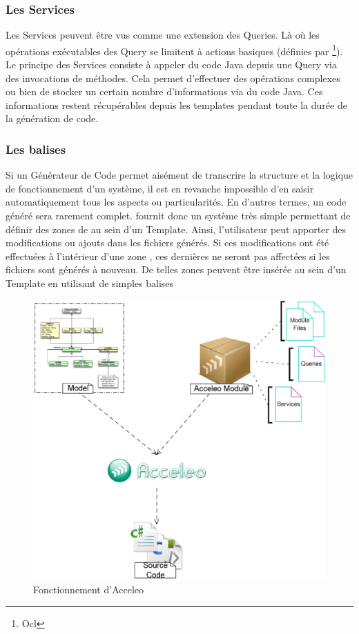 \subsubsection{Les Services}

Les Services peuvent être vus comme une extension des Queries. Là où les opérations exécutables des Query se limitent à actions basiques (définies par \footnote{Ocl}{}). Le principe des Services consiste à appeler du code Java depuis une Query via des invocations de méthodes. Cela permet d'effectuer des opérations complexes ou bien de stocker un certain nombre d'informations via du code Java. Ces informations restent récupérables depuis les templates pendant toute la durée de la génération de code.

\subsubsection{Les balises }

Si un Générateur de Code permet aisément de transcrire la structure et la logique de fonctionnement d'un système, il est en revanche impossible d'en saisir automatiquement tous les aspects ou particularités. En d'autres termes, un code généré sera rarement complet. \kwacceleo fournit donc un système très simple permettant de définir des zones de  au sein d'un Template. Ainsi, l'utilisateur peut apporter des modifications ou ajouts dans les fichiers générés. Si ces modifications ont été effectuées à l'intérieur d'une zone , ces dernières ne seront pas affectées si les fichiers sont générés à nouveau. De telles zones peuvent être insérée au sein d'un Template en utilisant de simples balises \guim{\textit{\textbf{[protected]}}}

\begin{figure}[htb]
  \centering
  \includegraphics[scale=0.29]{img/acceleo_scheme.eps}
  \caption{Fonctionnement d'Acceleo}
  \label{fig:acceleo}
\end{figure}


